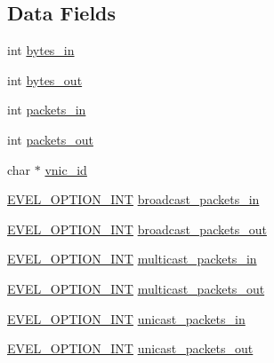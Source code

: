 \subsection*{Data Fields}
\begin{DoxyCompactItemize}
\item 
int \hyperlink{structmeasurement__vnic__use_ad6289ea98d480dfc89aff65304ac665c}{bytes\+\_\+in}
\item 
int \hyperlink{structmeasurement__vnic__use_a3531ca46c61940621cea0f4d34f58855}{bytes\+\_\+out}
\item 
int \hyperlink{structmeasurement__vnic__use_a3b7f900c41afff86c33dec3e211bc7c8}{packets\+\_\+in}
\item 
int \hyperlink{structmeasurement__vnic__use_a2cf0c13cafa8e5118a2216cc46bd0e89}{packets\+\_\+out}
\item 
char $\ast$ \hyperlink{structmeasurement__vnic__use_a2fd8f65f55f741c4c032ba2e6bda2da9}{vnic\+\_\+id}
\item 
\hyperlink{evel_8h_a452d825778d1c2368a54b8f689a25ba7}{E\+V\+E\+L\+\_\+\+O\+P\+T\+I\+O\+N\+\_\+\+I\+NT} \hyperlink{structmeasurement__vnic__use_ad389902a9393b27a6feca5025543687b}{broadcast\+\_\+packets\+\_\+in}
\item 
\hyperlink{evel_8h_a452d825778d1c2368a54b8f689a25ba7}{E\+V\+E\+L\+\_\+\+O\+P\+T\+I\+O\+N\+\_\+\+I\+NT} \hyperlink{structmeasurement__vnic__use_ac6b9e16ed9578dcd78997f30a486c23d}{broadcast\+\_\+packets\+\_\+out}
\item 
\hyperlink{evel_8h_a452d825778d1c2368a54b8f689a25ba7}{E\+V\+E\+L\+\_\+\+O\+P\+T\+I\+O\+N\+\_\+\+I\+NT} \hyperlink{structmeasurement__vnic__use_a8145b9c9be62f0d1b50d27572e6a2b3f}{multicast\+\_\+packets\+\_\+in}
\item 
\hyperlink{evel_8h_a452d825778d1c2368a54b8f689a25ba7}{E\+V\+E\+L\+\_\+\+O\+P\+T\+I\+O\+N\+\_\+\+I\+NT} \hyperlink{structmeasurement__vnic__use_aae71f8b2a7af31ed1c70be76e5021db5}{multicast\+\_\+packets\+\_\+out}
\item 
\hyperlink{evel_8h_a452d825778d1c2368a54b8f689a25ba7}{E\+V\+E\+L\+\_\+\+O\+P\+T\+I\+O\+N\+\_\+\+I\+NT} \hyperlink{structmeasurement__vnic__use_a04f981374e31362ca9f5daad328229a5}{unicast\+\_\+packets\+\_\+in}
\item 
\hyperlink{evel_8h_a452d825778d1c2368a54b8f689a25ba7}{E\+V\+E\+L\+\_\+\+O\+P\+T\+I\+O\+N\+\_\+\+I\+NT} \hyperlink{structmeasurement__vnic__use_a4a4cd7bddd52b0363a3e25b4ee18444c}{unicast\+\_\+packets\+\_\+out}
\end{DoxyCompactItemize}


